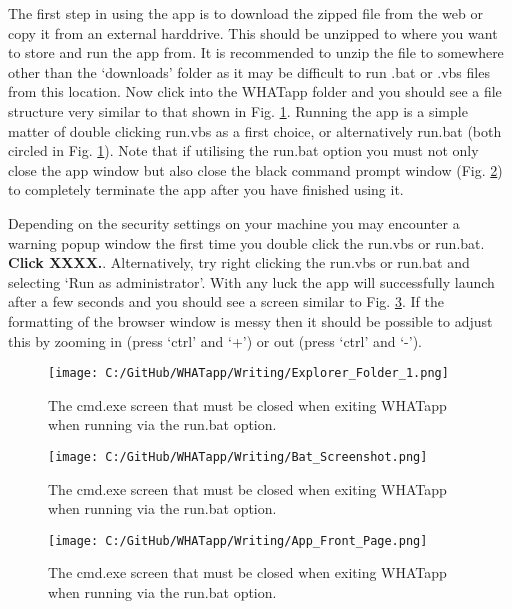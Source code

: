 \documentclass[11pt]{article}
\begin{document}
The first step in using the app is to download the zipped file from the web or copy it from an external harddrive. This should be unzipped to where you want to store and run the app from. It is recommended to unzip the file to somewhere other than the `downloads' folder as it may be difficult to run .bat or .vbs files from this location. Now click into the WHATapp folder and you should see a file structure very similar to that shown in Fig. \ref{fig:expl1screen}. Running the app is a simple matter of double clicking run.vbs as a first choice, or alternatively run.bat (both circled in Fig. \ref{fig:expl1screen}). Note that if utilising the run.bat option you must not only close the app window but also close the black command prompt window (Fig. \ref{fig:batscreen}) to completely terminate the app after you have finished using it.

Depending on the security settings on your machine you may encounter a warning popup window the first time you double click the run.vbs or run.bat. {\bf Click XXXX.}. Alternatively, try right clicking the run.vbs or run.bat and selecting `Run as administrator'. With any luck the app will successfully launch after a few seconds and you should see a screen similar to Fig. \ref{fig:frontpg}. If the formatting of the browser window is messy then it should be possible to adjust this by zooming in (press `ctrl' and `+') or out (press `ctrl' and `-').

 \begin{figure} [h]
  \centering
\texttt{[image: C:/GitHub/WHATapp/Writing/Explorer\_Folder\_1.png]}
  \caption {The cmd.exe screen that must be closed when exiting WHATapp when running via the run.bat option.}
  \label{fig:expl1screen}
\end{figure}


 \begin{figure} [h]
  \centering
\texttt{[image: C:/GitHub/WHATapp/Writing/Bat\_Screenshot.png]}
  \caption {The cmd.exe screen that must be closed when exiting WHATapp when running via the run.bat option.}
  \label{fig:batscreen}
\end{figure}


 \begin{figure} [h]
  \centering
\texttt{[image: C:/GitHub/WHATapp/Writing/App\_Front\_Page.png]}
  \caption {The cmd.exe screen that must be closed when exiting WHATapp when running via the run.bat option.}
  \label{fig:frontpg}
\end{figure}
\end{document}
